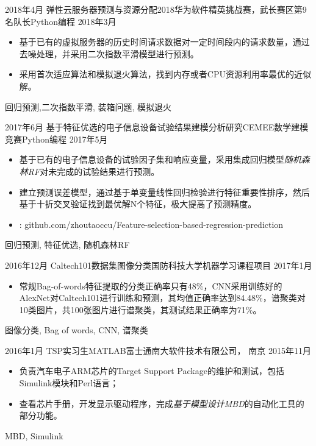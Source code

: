 %
%


 
\begin{experiences}

  \experience
  {2018年4月} {弹性云服务器预测与资源分配}{2018华为软件精英挑战赛，武长赛区第9名队长}{Python编程} %
  {2018年3月 } {
				  	\begin{itemize}
				  		\item  基于已有的虚拟服务器的历史时间请求数据对一定时间段内的请求数量，通过去噪处理，并采用二次指数平滑模型进行预测。
				  		\item 采用首次适应算法和模拟退火算法，找到内存或者CPU资源利用率最优的近似解。
				  	\end{itemize}
				  }
				  {回归预测,二次指数平滑, 装箱问题, 模拟退火}

  \emptySeparator
  \experience
  {2017年6月} {基于特征优选的电子信息设备试验结果建模分析研究}{CEMEE数学建模竞赛}{Python编程}
  {2017年5月 } {
				  	\begin{itemize}
				  		\item  基于已有的电子信息设备的试验因子集和响应变量，采用集成回归模型\emph{随机森林RF}对未完成的试验结果进行预测。
				  		\item 建立预测误差模型，通过基于单变量线性回归检验进行特征重要性排序，然后基于十折交叉验证找到最优解N个特征，极大提高了预测精度。
						\item \faGithub:  {github.com/zhoutaoccu/Feature-selection-based-regression-prediction}
				  	\end{itemize}
				  }
				  {回归预测, 特征优选, 随机森林RF}

  \emptySeparator
  \experience
  {2016年12月} {Caltech101数据集图像分类}{国防科技大学}{机器学习课程项目}
  {2017年1月}    {
				  	\begin{itemize}
				  		\item 常规Bag-of-words特征提取的分类正确率只有48\%，CNN采用训练好的AlexNet对Caltech101进行训练和预测，其均值正确率达到84.48\%，谱聚类对10类图片，共100张图片进行谱聚类，其测试结果正确率为71\%。
				  	\end{itemize}
				  }
				  {图像分类, Bag of words, CNN, 谱聚类}

  \emptySeparator			
  \experience
  {2016年1月} {TSP实习生}{MATLAB}{富士通南大软件技术有限公司， 南京}
  {2015年11月}    {
  	\begin{itemize}
  		\item  负责汽车电子ARM芯片的Target Support Package的维护和测试，包括Simulink模块和Perl语言；
  		\item  查看芯片手册，开发显示驱动程序，完成\emph{基于模型设计MBD}的自动化工具的部分功能。
  	\end{itemize}
  }
  {MBD, Simulink}


\end{experiences}
